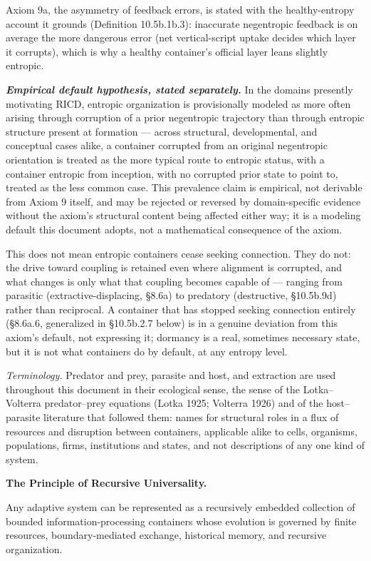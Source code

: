 \documentclass[
]{article}
\begin{document}
Axiom 9a, the asymmetry of feedback errors, is stated with the
healthy-entropy account it grounds (Definition 10.5b.1b.3): inaccurate
negentropic feedback is on average the more dangerous error (net
vertical-script uptake decides which layer it corrupts), which is why a
healthy container's official layer leans slightly entropic.

\emph{\textbf{Empirical default hypothesis, stated separately.}} In the
domains presently motivating RICD, entropic organization is
provisionally modeled as more often arising through corruption of a
prior negentropic trajectory than through entropic structure present at
formation --- across structural, developmental, and conceptual cases
alike, a container corrupted from an original negentropic orientation is
treated as the more typical route to entropic status, with a container
entropic from inception, with no corrupted prior state to point to,
treated as the less common case. This prevalence claim is empirical, not
derivable from Axiom 9 itself, and may be rejected or reversed by
domain-specific evidence without the axiom's structural content being
affected either way; it is a modeling default this document adopts, not
a mathematical consequence of the axiom.

This does not mean entropic containers cease seeking connection. They do
not: the drive toward coupling is retained even where alignment is
corrupted, and what changes is only what that coupling becomes capable
of --- ranging from parasitic (extractive-displacing, §8.6a) to
predatory (destructive, §10.5b.9d) rather than reciprocal. A container
that has stopped seeking connection entirely (§8.6a.6, generalized in
§10.5b.2.7 below) is in a genuine deviation from this axiom's default,
not expressing it; dormancy is a real, sometimes necessary state, but it
is not what containers do by default, at any entropy level.

\emph{Terminology.} Predator and prey, parasite and host, and extraction
are used throughout this document in their ecological sense, the sense
of the Lotka--Volterra predator--prey equations (Lotka 1925; Volterra
1926) and of the host--parasite literature that followed them: names for
structural roles in a flux of resources and disruption between
containers, applicable alike to cells, organisms, populations, firms,
institutions and states, and not descriptions of any one kind of system.

\textbf{The Principle of Recursive Universality.}

Any adaptive system can be represented as a recursively embedded
collection of bounded information-processing containers whose evolution
is governed by finite resources, boundary-mediated exchange, historical
memory, and recursive organization.
\end{document}
